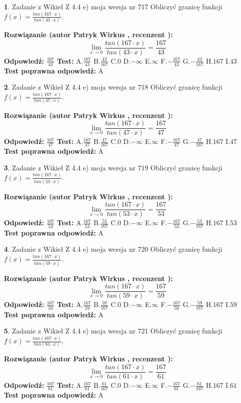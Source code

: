 \documentclass[12pt, a4paper]{article}
\theoremstyle{definition} %
\newtheorem{zad}{}
\newcommand{\zadStart}[1]{\begin{zad}#1\newline}
\newcommand{\zadStop}{\end{zad}}
\newcommand{\rozwStart}[2]{\noindent \textbf{Rozwiązanie (autor #1 , recenzent #2): }\newline}
\newcommand{\rozwStop}{\newline}
\newcommand{\odpStart}{\noindent \textbf{Odpowiedź:}\newline}
\newcommand{\odpStop}{\newline}
\newcommand{\testStart}{\noindent \textbf{Test:}\newline}
\newcommand{\testStop}{\newline}
\newcommand{\kluczStart}{\noindent \textbf{Test poprawna odpowiedź:}\newline}
\newcommand{\kluczStop}{\newline}
\begin{document}
\zadStart{Zadanie z Wikieł Z 4.4 e) moja wersja nr 717}
Obliczyć granicę funkcji $f(x)=\frac{tan(167\cdot x)}{tan(43\cdot x)}$.
\zadStop
\rozwStart{Patryk Wirkus}{}
$$\lim\limits_{x\to 0}\frac{tan(167\cdot x)}{tan(43\cdot x)}=
\frac{167}{43}$$
\rozwStop
\odpStart
$\frac{167}{43}$
\odpStop
\testStart
A.$\frac{167}{43}$
B.$\frac{43}{167}$
C.$0$
D.$-\infty$
E.$\infty$
F.$-\frac{167}{43}$
G.$-\frac{43}{167}$
H.$167$
I.$43$
\testStop
\kluczStart
A
\kluczStop



\zadStart{Zadanie z Wikieł Z 4.4 e) moja wersja nr 718}
Obliczyć granicę funkcji $f(x)=\frac{tan(167\cdot x)}{tan(47\cdot x)}$.
\zadStop
\rozwStart{Patryk Wirkus}{}
$$\lim\limits_{x\to 0}\frac{tan(167\cdot x)}{tan(47\cdot x)}=
\frac{167}{47}$$
\rozwStop
\odpStart
$\frac{167}{47}$
\odpStop
\testStart
A.$\frac{167}{47}$
B.$\frac{47}{167}$
C.$0$
D.$-\infty$
E.$\infty$
F.$-\frac{167}{47}$
G.$-\frac{47}{167}$
H.$167$
I.$47$
\testStop
\kluczStart
A
\kluczStop



\zadStart{Zadanie z Wikieł Z 4.4 e) moja wersja nr 719}
Obliczyć granicę funkcji $f(x)=\frac{tan(167\cdot x)}{tan(53\cdot x)}$.
\zadStop
\rozwStart{Patryk Wirkus}{}
$$\lim\limits_{x\to 0}\frac{tan(167\cdot x)}{tan(53\cdot x)}=
\frac{167}{53}$$
\rozwStop
\odpStart
$\frac{167}{53}$
\odpStop
\testStart
A.$\frac{167}{53}$
B.$\frac{53}{167}$
C.$0$
D.$-\infty$
E.$\infty$
F.$-\frac{167}{53}$
G.$-\frac{53}{167}$
H.$167$
I.$53$
\testStop
\kluczStart
A
\kluczStop



\zadStart{Zadanie z Wikieł Z 4.4 e) moja wersja nr 720}
Obliczyć granicę funkcji $f(x)=\frac{tan(167\cdot x)}{tan(59\cdot x)}$.
\zadStop
\rozwStart{Patryk Wirkus}{}
$$\lim\limits_{x\to 0}\frac{tan(167\cdot x)}{tan(59\cdot x)}=
\frac{167}{59}$$
\rozwStop
\odpStart
$\frac{167}{59}$
\odpStop
\testStart
A.$\frac{167}{59}$
B.$\frac{59}{167}$
C.$0$
D.$-\infty$
E.$\infty$
F.$-\frac{167}{59}$
G.$-\frac{59}{167}$
H.$167$
I.$59$
\testStop
\kluczStart
A
\kluczStop



\zadStart{Zadanie z Wikieł Z 4.4 e) moja wersja nr 721}
Obliczyć granicę funkcji $f(x)=\frac{tan(167\cdot x)}{tan(61\cdot x)}$.
\zadStop
\rozwStart{Patryk Wirkus}{}
$$\lim\limits_{x\to 0}\frac{tan(167\cdot x)}{tan(61\cdot x)}=
\frac{167}{61}$$
\rozwStop
\odpStart
$\frac{167}{61}$
\odpStop
\testStart
A.$\frac{167}{61}$
B.$\frac{61}{167}$
C.$0$
D.$-\infty$
E.$\infty$
F.$-\frac{167}{61}$
G.$-\frac{61}{167}$
H.$167$
I.$61$
\testStop
\kluczStart
A
\kluczStop
\end{document}
